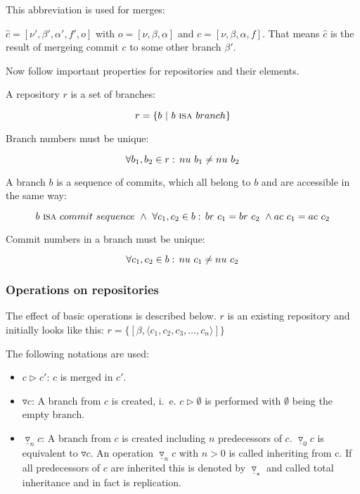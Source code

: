 \documentclass[fleqn, 10pt, a4paper]{article}
\begin{document}
This abbreviation is used for merges:

$\hat c = [\nu', \beta', \alpha', f', o]$ with $o=[\nu, \beta, \alpha]$ and
$c=[\nu, \beta, \alpha, f]$. That means $\hat c$ is the result of mergeing
commit $c$ to some other branch $\beta'$.

Now follow important properties for repositories and their elements.

A repository $r$ is a set of branches:

\begin{displaymath}
r = \{b \ |\ b\ \mbox{\textsc{isa}}\ \mathnormal{branch}\}
\end{displaymath}

Branch numbers must be unique:

\begin{displaymath}
\forall b_1, b_2 \in r:\, \mathnormal{nu}\ b_1 \neq \mathnormal{nu}\ b_2
\end{displaymath}

A branch $b$ is a sequence of commits, which all belong to
$b$ and are accessible in the same way:

\begin{displaymath}
b\ \mbox{\textsc{isa}}\ \mathnormal{commit}\ \mathnormal{sequence}\ \wedge\
\forall c_1, c_2 \in b:\, \mathnormal{br}\ c_1 = \mathnormal{br}\ c_2\ \wedge
\mathnormal{ac}\ c_1 = \mathnormal{ac}\ c_2
\end{displaymath}

Commit numbers in a branch must be unique:

\begin{displaymath}
\forall c_1, c_2 \in b:\, \mathnormal{nu}\ c_1 \neq
\mathnormal{nu}\ c_2
\end{displaymath}

\subsubsection{Operations on repositories}

The effect of basic operations is described below. $r$ is an
existing repository and initially looks like this:
$r = \{[\beta, \langle c_1, c_2, c_3, \ldots, c_n\rangle]\}$

The following notations are used:

\begin{itemize}
\item $c \rhd c'$: $c$ is merged in $c'$.
\item $\triangledown c$: A branch from $c$ is created, i.~e. $c \rhd \emptyset$
is performed with $\emptyset$ being the empty branch.
\item $\underline\triangledown_n c$: A branch from $c$ is created including $n$
predecessors of $c$. $\underline\triangledown_0 c$ is equivalent to
$\triangledown c$.
An operation $\underline\triangledown_n c$ with $n>0$ is called inheriting from c.
If all predecessors of $c$ are inherited this is denoted
by $\underline\triangledown_\star$
and called total inheritance and in fact is replication.
\end{itemize}
\end{document}
